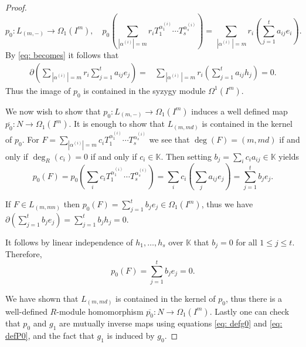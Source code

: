 \documentclass[10pt,a4paper]{amsart}
\begin{document}
\begin{proof}
    \begin{equation}\label{eq: defP0}
        p_0:L_{(m,-)}\rightarrow \Omega_1\left(I^m\right),\quad
        p_0\left(\sum_{|\alpha^{(i)}|=m} r_i T_1^{\alpha_1^{(i)}}\cdots T_s^{\alpha_s^{(i)}}\right)=\sum_{\,|\alpha^{(i)}\,|=m} r_i \left(\sum_{j=1}^t a_{ij} e_{i}\right).
    \end{equation}
    By \eqref{eq: becomes} it follows that
    \begin{align*}
        \partial\left( \sum_{\,|\alpha^{(i)}\,|=m} r_i \sum_{j=1}^t a_{ij} e_{j}\right)
        =&\sum_{\,|\alpha^{(i)}\,|=m} r_i \left(\sum_{j=1}^t a_{ij} h_{j}\right)=0.
    \end{align*}
    Thus the image of $p_0$ is contained in the syzygy module \(\Omega^1(I^m)\).

    We now wish to show that $p_0: L_{(m, -)} \to \Omega_1(I^m)$ induces a well defined map $\overline{p_0}: N \to \Omega_1(I^m)$. 
    It is enough to show that $L_{(m,md)}$ is contained in the kernel of $p_0$. For \(F=\sum_{|\alpha^{(i)}|=m}c_iT_1^{\alpha_1^{(i)}}\cdots T_s^{\alpha_s^{(i)}}\) we see that \(\deg{(F)}=(m,md)\) if and only if $\deg_R(c_i)=0$ if and only if $c_i \in \mathbb{K}$. 
    Then setting  \(b_j=\sum_{i} c_ia_{ij}\in\mathbb{K}\) yields
    \[p_0(F)=p_0\left(\sum_{i}c_iT_1^{\alpha_1^{(i)}}\cdots T_s^{\alpha_s^{(i)}}\right)=\sum_{i}c_i\left(\sum_j a_{ij}e_{j }\right)=\sum_{j=1}^t b_je_j.\]
   
    If $F\in L_{(m,mn)}$ then \(p_0(F)=\sum_{j=1}^t b_je_j\in\Omega_1(I^m)\), thus we have $\partial\left(\sum_{j=1}^t b_je_j \right)=\sum_{j=1}^t b_jh_j=0$.
 
    It follows by linear independence of $h_1, \ldots, h_s$ over $\mathbb{K}$ that \(b_j=0\) for all $1\leq j\leq t$. Therefore, \[p_0(F)=\sum_{j=1}^t b_je_j=0.\]
    
    We have shown that \(L_{(m,md)}\) is contained in the kernel of \(p_0\), thus  there is a well-defined $R$-module homomorphism $\overline{p_0}:N\to \Omega_1(I^m)$. 
    Lastly one can check that $p_0$ and $g_1$ are mutually inverse maps using equations \eqref{eq: defg0} and \eqref{eq: defP0}, and the fact that $g_1$ is induced by $g_0$.
\end{proof}
\end{document}
